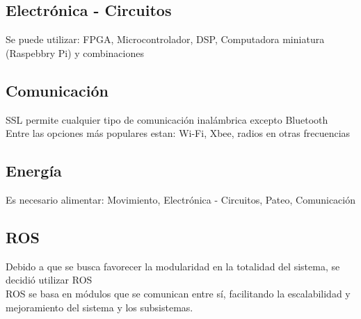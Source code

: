 {\subsection {Electrónica - Circuitos}
Se puede utilizar: FPGA, Microcontrolador, DSP, Computadora miniatura (Raspebbry Pi) y combinaciones \\

\subsection {Comunicación}
SSL permite cualquier tipo de comunicación inalámbrica excepto Bluetooth \\
Entre las opciones más populares estan: \gls{Wi-Fi}, Xbee, radios en otras frecuencias \\

\subsection {Energía}
Es necesario alimentar: Movimiento, Electrónica - Circuitos, Pateo, Comunicación \\



\subsection {ROS}
Debido a que se busca favorecer la modularidad en la totalidad del sistema, se decidió utilizar ROS \\
ROS se basa en módulos que se comunican entre sí, facilitando la escalabilidad y mejoramiento del sistema y los subsistemas. \\
}


